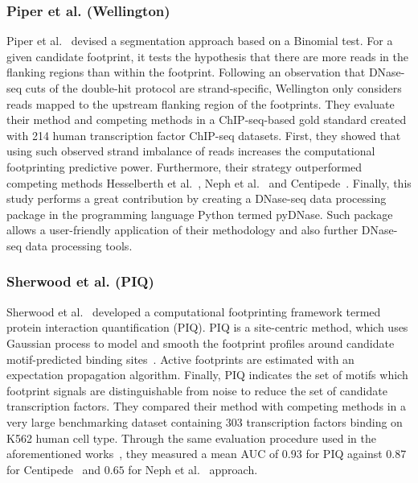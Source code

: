 \subsubsection{Piper et al. (Wellington)}
\label{sec:piper.2}

Piper et al.~\cite{piper2013} devised a segmentation approach based on a Binomial test. For a given candidate footprint, it tests the hypothesis that there are more reads in the flanking regions than within the footprint. Following an observation that DNase-seq cuts of the double-hit protocol are strand-specific, Wellington only considers reads mapped to the upstream flanking region of the footprints. They evaluate their method and competing methods in a ChIP-seq-based gold standard created with 214 human transcription factor ChIP-seq datasets. First, they showed that using such observed strand imbalance of reads increases the computational footprinting predictive power. Furthermore, their strategy outperformed competing methods Hesselberth et al.~\cite{hesselberth2009}, Neph et al.~\cite{neph2012a} and Centipede~\cite{pique2011}. Finally, this study performs a great contribution by creating a DNase-seq data processing package in the programming language Python termed pyDNase. Such package allows a user-friendly application of their methodology and also further DNase-seq data processing tools.

\subsubsection{Sherwood et al. (PIQ)}
\label{sec:sherwood.2}

Sherwood et al.~\cite{sherwood2014} developed a computational footprinting framework termed protein interaction quantification (PIQ). PIQ is a site-centric method, which uses Gaussian process to model and smooth the footprint profiles around candidate motif-predicted binding sites~\cite{sherwood2014}. Active footprints are estimated with an expectation propagation algorithm. Finally, PIQ indicates the set of motifs which footprint signals are distinguishable from noise to reduce the set of candidate transcription factors. They compared their method with competing methods in a very large benchmarking dataset containing $303$ transcription factors binding on K562 human cell type. Through the same evaluation procedure used in the aforementioned works~\cite{pique2011,cuellar2012,piper2013}, they measured a mean AUC of $0.93$ for PIQ against $0.87$ for Centipede~\cite{pique2011} and $0.65$ for Neph et al.~\cite{neph2012a} approach.

